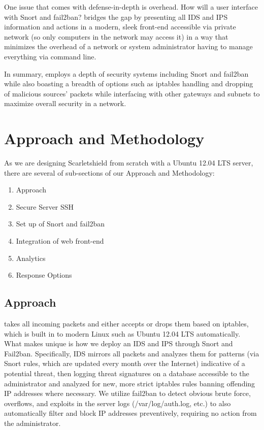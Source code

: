\documentclass[11.5pt,letterpaper,titlepage]{report}
\begin{document}
One issue that comes with defense-in-depth is overhead.  How will a user
interface with Snort and fail2ban?  \scarletshield bridges the gap by presenting
all IDS and IPS information and actions in a modern, sleek front-end accessible
via private network (so only computers in the \scarletshield network may access
it) in a way that minimizes the overhead of a network or system administrator
having to manage everything via command line.

In summary, \scarletshield employs a depth of security systems including Snort
and fail2ban while also boasting a breadth of options such as iptables handling
and dropping of malicious sources’ packets while interfacing with other gateways
and subnets to maximize overall security in a network.

\chapter{Approach and Methodology}

As we are designing Scarletshield from scratch with a Ubuntu 12.04 LTS server,
there are several of sub-sections of our Approach and Methodology:

\begin{enumerate}
\item Approach
\item Secure Server SSH
\item Set up of Snort and fail2ban
\item Integration of web front-end
\item Analytics
\item Response Options
\end{enumerate}

\section{Approach}

\scarletshield takes all incoming packets and either accepts or drops them based
on iptables, which is built in to modern Linux \distros such as Ubuntu 12.04 LTS
automatically.  What makes \scarletshield unique is how we deploy an IDS and IPS
through Snort and Fail2ban.  Specifically, IDS mirrors all packets and analyzes
them for patterns (via Snort rules, which are updated every month over the
Internet) indicative of a potential threat, then logging threat signatures on a
database accessible to the administrator and analyzed for new, more strict
iptables rules banning offending IP addresses where necessary.  We utilize
fail2ban to detect obvious brute force, overflows, and exploits in the server
logs (/var/log/auth.log, etc.) to also automatically filter and block IP
addresses preventively, requiring no action from the administrator.
\end{document}
